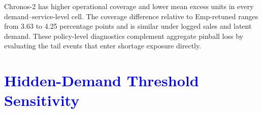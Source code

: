 \documentclass[msom,dblanonrev]{informs4}
\newcommand{\add}[1]{\textcolor{blue}{#1}}
\begin{document}
\begin{table}[htbp]
\caption{Operational tail calibration. Coverage, gap, and exceedance are percentages; mean excess units average $(D-S)^+$ over all scored cells. Logged-sales intervals resample SKU clusters; latent-demand intervals use the two-way SKU-cluster $\times$ draw bootstrap ($B=10{,}000$).}\label{tab:oa_tailcal}
\centering\scriptsize
{}
\end{table}

Chronos-2 has higher operational coverage and lower mean excess units in every demand--service-level cell.
The coverage difference relative to Emp-retuned ranges from 3.63 to 4.25 percentage points and is similar under logged sales and latent demand.
These policy-level diagnostics complement aggregate pinball loss by evaluating the tail events that enter shortage exposure directly.

\section{\add{Hidden-Demand Threshold Sensitivity}}\label{oa:hidden-threshold}
\end{document}
